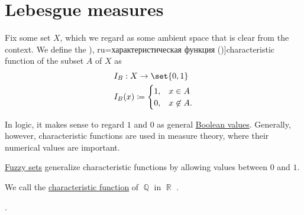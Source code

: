 \section{Lebesgue measures}\label{sec:lebesgue_measures}

\begin{definition}\label{def:subset_characteristic_function}
  Fix some set \( X \), which we regard as some ambient space that is clear from the context. We define the \term[bg=характеристична функция (\cite[exerc. 4.1]{Драганов2022ТеорияНаМярката}), ru=характеристическая функция (\cite[131]{Богачёв2003ОсновыТеорииМерыТом1})]{characteristic function} of the subset \( A \) of \( X \) as
  \begin{equation}\label{eq:def:dirichlet_function}
    \begin{aligned}
      &I_B: X \to \set{ 0, 1 } \\
      &I_B(x) \coloneqq \begin{cases}
        1, &x \in A \\
        0, &x \not\in A.
      \end{cases}
    \end{aligned}
  \end{equation}
\end{definition}
\begin{comments}
  \item In logic, it makes sense to regard \( 1 \) and \( 0 \) as general \hyperref[con:boolean_value]{Boolean values}. Generally, however, characteristic functions are used in measure theory, where their numerical values are important.

  \item \hyperref[def:fuzzy_set]{Fuzzy sets} generalize characteristic functions by allowing values between \( 0 \) and \( 1 \).
\end{comments}

\begin{definition}\label{def:dirichlet_function}
  We call the \hyperref[def:subset_characteristic_function]{characteristic function} of \( \BbbQ \) in \( \BbbR \) .
\end{definition}

\begin{definition}\label{def:lebesgue_measure}
  .
\end{definition}
